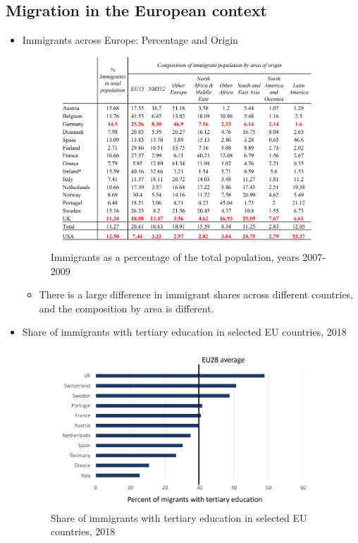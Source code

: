 \subsection {Migration in the European context}
\begin{itemize}
\item Immigrants across Europe: Percentage and Origin
\begin{figure}[H]
                \centering
                \includegraphics[width=4in]{images/ch11/3.png}
                \caption{Immigrants as a percentage of the total population, years 2007-2009}
            \end{figure}
            
\begin{itemize}
    \item There is a large difference in immigrant shares across different countries, and the composition by area is different.
\end{itemize}

\item Share of immigrants with tertiary education in selected EU countries, 2018
\begin{figure}[H]
                \centering
                \includegraphics[width=4in]{images/ch11/4.png}
                \caption{Share of immigrants with tertiary education in selected EU countries, 2018}
            \end{figure}
            

\end{itemize}
